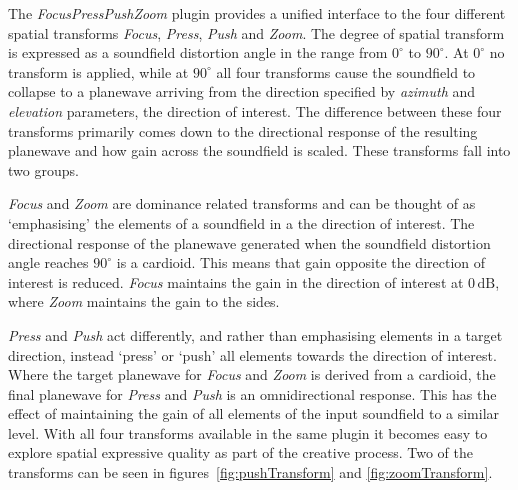 \documentclass{article}
\begin{document}
The \emph{FocusPressPushZoom} plugin provides a unified interface to the four different spatial transforms \emph{Focus}, \emph{Press}, \emph{Push} and \emph{Zoom}.
The degree of spatial transform is expressed as a soundfield distortion angle in the range from $0^\circ$ to $90^\circ$.
At $0^\circ$ no transform is applied, while at $90^\circ$ all four transforms cause the soundfield to collapse to a planewave arriving from the direction specified by \emph{azimuth} and \emph{elevation} parameters, the direction of interest. The difference between these four transforms primarily comes down to the directional response of the resulting planewave and how gain across the soundfield is scaled. These transforms fall into two groups.

\emph{Focus} and \emph{Zoom} are dominance related transforms and can be thought of as `emphasising' the elements of a soundfield in a the direction of interest. The directional response of the planewave generated when the soundfield distortion angle reaches $90^\circ$ is a cardioid. This means that gain opposite the direction of interest is reduced. \emph{Focus} maintains the gain in the direction of interest at $0\,\mathrm{dB}$, where \emph{Zoom} maintains the gain to the sides.

\emph{Press} and \emph{Push} act differently, and rather than emphasising elements in a target direction, instead `press' or `push' all elements towards the direction of interest. Where the target planewave for \emph{Focus} and \emph{Zoom} is derived from a cardioid, the final planewave for \emph{Press} and \emph{Push} is an omnidirectional response. This has the effect of maintaining the gain of all elements of the input soundfield to a similar level. With all four transforms available in the same plugin it becomes easy to explore spatial expressive quality as part of the creative process. Two of the transforms can be seen in figures~\ref{fig:pushTransform} and \ref{fig:zoomTransform}.
\end{document}
